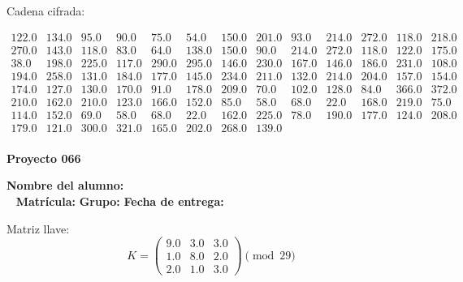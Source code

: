 \documentclass[12pt]{article}
\begin{document}
Cadena cifrada:
\begin{center}
$\begin{array}{lllllllllllll}
122.0 & 134.0 & 95.0 & 90.0 & 75.0 & 54.0 & 150.0 & 201.0 & 93.0 & 214.0 & 272.0 & 118.0 & 218.0\\
270.0 & 143.0 & 118.0 & 83.0 & 64.0 & 138.0 & 150.0 & 90.0 & 214.0 & 272.0 & 118.0 & 122.0 & 175.0\\
38.0 & 198.0 & 225.0 & 117.0 & 290.0 & 295.0 & 146.0 & 230.0 & 167.0 & 146.0 & 186.0 & 231.0 & 108.0\\
194.0 & 258.0 & 131.0 & 184.0 & 177.0 & 145.0 & 234.0 & 211.0 & 132.0 & 214.0 & 204.0 & 157.0 & 154.0\\
174.0 & 127.0 & 130.0 & 170.0 & 91.0 & 178.0 & 209.0 & 70.0 & 102.0 & 128.0 & 84.0 & 366.0 & 372.0\\
210.0 & 162.0 & 210.0 & 123.0 & 166.0 & 152.0 & 85.0 & 58.0 & 68.0 & 22.0 & 168.0 & 219.0 & 75.0\\
114.0 & 152.0 & 69.0 & 58.0 & 68.0 & 22.0 & 162.0 & 225.0 & 78.0 & 190.0 & 177.0 & 124.0 & 208.0\\
179.0 & 121.0 & 300.0 & 321.0 & 165.0 & 202.0 & 268.0 & 139.0\\
\end{array}$
\end{center}

\newpage


\textbf{Proyecto 066}

\textbf{Nombre del alumno:} \underline{\hspace{13cm}}\\\
\vspace{1cm}
\textbf{Matrícula:} \underline{\hspace{4cm}} \hspace{1cm}
\textbf{Grupo:} \underline{\hspace{2cm}}
\textbf{Fecha de entrega:} \underline{\hspace{2cm}}

\medskip

Matriz llave:
\[
K = \begin{pmatrix}
9.0 & 3.0 & 3.0\\
1.0 & 8.0 & 2.0\\
2.0 & 1.0 & 3.0
\end{pmatrix} \pmod{29}
\]
\end{document}
